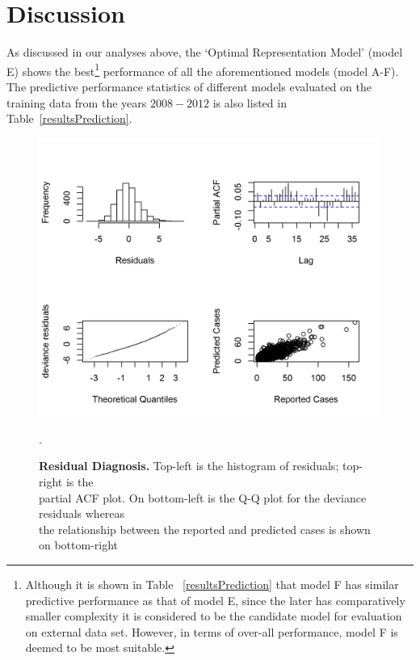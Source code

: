 \documentclass{bmcart}
\begin{document}
\section{Discussion} \label{discussion}

As discussed in our analyses above, the `Optimal Representation Model' (model E) shows the best\footnote{Although it is shown in Table ~\ref{resultsPrediction} that model F has similar predictive performance as that of model E, since the later has comparatively smaller complexity it is considered to be the candidate model for evaluation on external data set. However, in terms of over-all performance, model F is deemed to be most suitable.} performance of all the aforementioned models (model A-F). The predictive performance statistics of different models evaluated on the training data from the years $2008-2012$ is also listed in Table~\ref{resultsPrediction}. 



\begin{figure}[h!]
	\begin{center}
		\includegraphics[width= 1.0\textwidth]{19-resid-diagnosis}
		\caption{\textbf{Residual Diagnosis.} Top-left is the histogram of residuals; top-right is the \\ partial ACF plot. On bottom-left is the Q-Q plot for the deviance residuals whereas \\ the relationship between the reported and predicted cases is shown on bottom-right}.
		\label{figure:resid-diagnosis}
	\end{center}
\end{figure}
\end{document}
